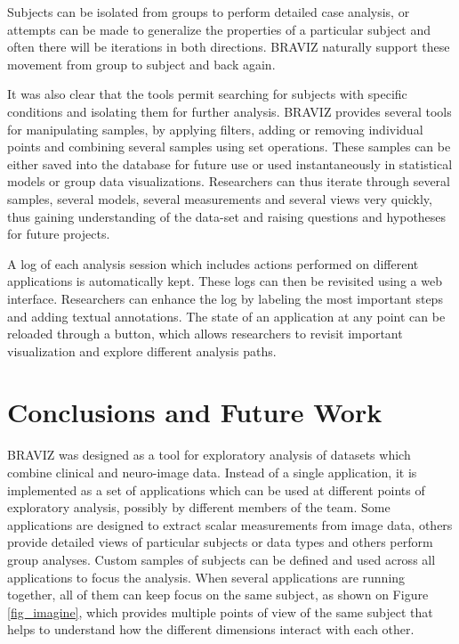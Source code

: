 \documentclass[twocolumn]{svjour3}
\begin{document}
Subjects can be isolated from groups to perform detailed case analysis, or attempts can be made to generalize the properties of a particular subject and often there will be iterations in both directions. BRAVIZ naturally support these movement from group to subject and back again.

It was also clear that the tools permit searching for subjects with specific conditions and isolating them for further analysis.
BRAVIZ provides several tools for manipulating samples, by applying filters, adding or removing individual points and combining several samples using set operations. These samples can be either saved into the database for future use or used instantaneously in statistical models or group data visualizations. Researchers can thus iterate through several samples, several models, several measurements and several views very quickly, thus gaining understanding of the data-set and raising questions and hypotheses for future projects.

A log of each analysis session which includes actions performed on different applications is automatically kept. These logs can then be revisited using a web interface. Researchers can enhance the log by labeling the most important steps and adding textual annotations. The state of an application at any point can be reloaded through a button, which allows researchers to revisit important visualization and explore different analysis paths. 

\section{Conclusions and Future Work}

BRAVIZ was designed as a tool for exploratory analysis of datasets which combine clinical and neuro-image data. Instead of a single application, it is implemented as a set of applications which can be used at different points of exploratory analysis, possibly by different members of the team. Some applications are designed to extract scalar measurements from image data, others provide detailed views of particular subjects or data types and others perform group analyses. Custom samples of subjects can be defined and used across all applications to focus the analysis. When several applications are running together, all of them can keep focus on the same subject, as shown on Figure \ref{fig_imagine}, which provides multiple points of view of the same subject that helps to understand how the different dimensions interact with each other. 
\end{document}
